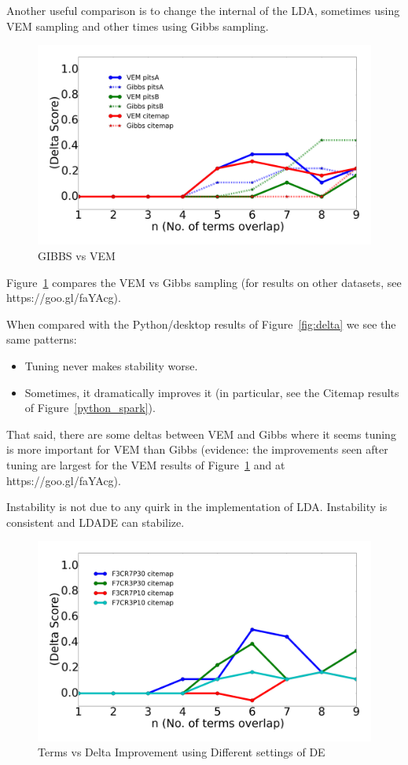 \documentclass[twocolumn,5p,sort&compress]{elsarticle}
\newcommand{\bi}{\begin{itemize}}
\newcommand{\ei}{\end{itemize}}
\theoremstyle{break}
\begin{document}
  Another useful comparison is to change the internal of the LDA, sometimes using VEM sampling and other times using Gibbs sampling.


\begin{figure}[!htbp]
  \captionsetup{justification=centering}
  \includegraphics[width=\linewidth]{./fig/gibbs_vem1.png}
  \caption{GIBBS vs VEM}
  \label{gibbs_vem}
\end{figure}


  Figure~\ref{gibbs_vem} compares the  VEM vs Gibbs sampling (for results on other datasets, see https://goo.gl/faYAcg).
   
   When compared with the Python/desktop results of
   Figure~\ref{fig:delta} we see the same patterns:
   \bi
 \item Tuning never makes stability worse.
 \item Sometimes, it dramatically improves it (in particular, see the Citemap results
   of  Figure~\ref{python_spark}).
   \ei
   That said, there are some deltas between VEM and Gibbs where it seems tuning
   is more important for VEM than Gibbs (evidence: the improvements seen after
   tuning are largest for the  VEM results of  Figure~\ref{gibbs_vem} and at  https://goo.gl/faYAcg).

\begin{lesson}
  Instability is not due to any quirk in the implementation of LDA. Instability is consistent and LDADE can stabilize. 
\end{lesson}

\begin{figure}[!b]
  \includegraphics[width=\linewidth]{./fig/citemap.png}
  \caption{Terms vs Delta Improvement using Different settings of DE}
  \label{fig:RQ4}
\end{figure}
\end{document}
